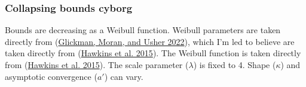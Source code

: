 \documentclass[
]{book}
\begin{document}
\hypertarget{collapsing-bounds-cyborg}{%
\subsubsection*{Collapsing bounds cyborg}\label{collapsing-bounds-cyborg}}

Bounds are decreasing as a Weibull function. Weibull parameters are taken directly from (\protect\hyperlink{ref-glickman2022}{Glickman, Moran, and Usher 2022}), which I'm led to believe are taken directly from (\protect\hyperlink{ref-hawkins2015}{Hawkins et al. 2015}). The Weibull function is taken directly from (\protect\hyperlink{ref-hawkins2015}{Hawkins et al. 2015}). The scale parameter (\(\lambda\)) is fixed to 4. Shape (\(\kappa\)) and asymptotic convergence (\(a'\)) can vary.
\end{document}
